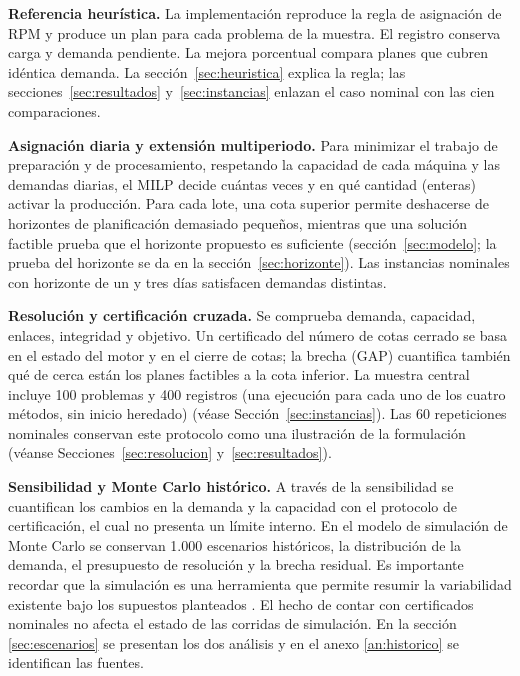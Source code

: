 \textbf{Referencia heurística.}
La implementación reproduce la regla de asignación de RPM y produce un plan para cada problema de la muestra. El registro conserva carga y demanda pendiente. La mejora porcentual compara planes que cubren idéntica demanda. La sección~\ref{sec:heuristica} explica la regla; las secciones~\ref{sec:resultados} y~\ref{sec:instancias} enlazan el caso nominal con las cien comparaciones.

\textbf{Asignación diaria y extensión multiperiodo.}
Para minimizar el trabajo de preparación y de procesamiento, respetando la capacidad de cada máquina y las demandas diarias, el MILP decide cuántas veces y en qué cantidad (enteras) activar la producción. Para cada lote, una cota superior permite deshacerse de horizontes de planificación demasiado pequeños, mientras que una solución factible prueba que el horizonte propuesto es suficiente (sección~\ref{sec:modelo}; la prueba del horizonte se da en la sección~\ref{sec:horizonte}). Las instancias nominales con horizonte de un y tres días satisfacen demandas distintas.

\textbf{Resolución y certificación cruzada.}
Se comprueba demanda, capacidad, enlaces, integridad y objetivo. Un certificado del número de cotas cerrado se basa en el estado del motor y en el cierre de cotas; la brecha (GAP) cuantifica también qué de cerca están los planes factibles a la cota inferior. La muestra central incluye 100 problemas y 400 registros (una ejecución para cada uno de los cuatro métodos, sin inicio heredado) (véase Sección~\ref{sec:instancias}). Las 60 repeticiones nominales conservan este protocolo como una ilustración de la formulación (véanse Secciones~\ref{sec:resolucion} y~\ref{sec:resultados}).

\textbf{Sensibilidad y Monte Carlo histórico.}
A través de la sensibilidad se cuantifican los cambios en la demanda y la capacidad con el protocolo de certificación, el cual no presenta un límite interno. En el modelo de simulación de Monte Carlo se conservan 1.000 escenarios históricos, la distribución de la demanda, el presupuesto de resolución y la brecha residual. Es importante recordar que la simulación es una herramienta que permite resumir la variabilidad existente bajo los supuestos planteados \cite{law}. El hecho de contar con certificados nominales no afecta el estado de las corridas de simulación. En la sección \ref{sec:escenarios} se presentan los dos análisis y en el anexo \ref{an:historico} se identifican las fuentes.

